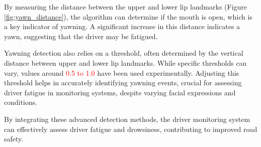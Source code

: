 By measuring the distance between the upper and lower lip landmarks (Figure \ref{fig:yawn_distance}), the algorithm can determine if the mouth is open, which is a key indicator of yawning. A significant increase in this distance indicates a yawn, suggesting that the driver may be fatigued.

Yawning detection also relies on a threshold, often determined by the vertical distance between upper and lower lip landmarks. While specific thresholds can vary, values around \textcolor{red}{0.5 to 1.0} have been used experimentally. Adjusting this threshold helps in accurately identifying yawning events, crucial for assessing driver fatigue in monitoring systems, despite varying facial expressions and conditions.

By integrating these advanced detection methods, the driver monitoring system can effectively assess driver fatigue and drowsiness, contributing to improved road safety.
